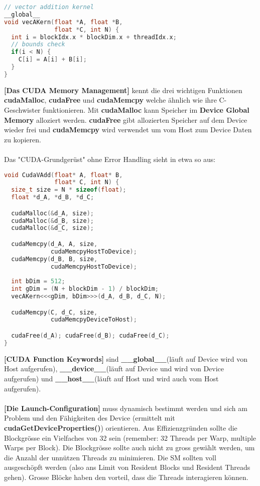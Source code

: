 \documentclass[8pt]{extarticle}
\let\oldtextbf\textbf
\renewcommand{\textbf}{\tiny\oldtextbf}
\begin{document}
\begin{multicols*}{5}
\begin{lstlisting}[language=c]
// vector addition kernel
__global__
void vecAKern(float *A, float *B,
              float *C, int N) {
  int i = blockIdx.x * blockDim.x + threadIdx.x;
  // bounds check
  if(i < N) {
    C[i] = A[i] + B[i];
  }
}
\end{lstlisting}
\textbf{[Das CUDA Memory Management]} kennt die drei wichtigen Funktionen \textbf{cudaMalloc}, \textbf{cudaFree} und \textbf{cudaMemcpy} welche ähnlich wie ihre C-Geschwister funktionieren. Mit \textbf{cudaMalloc} kann Speicher im \textbf{Device Global Memory} alloziert werden. \textbf{cudaFree} gibt allozierten Speicher auf dem Device wieder frei und \textbf{cudaMemcpy} wird verwendet um vom Host zum Device Daten zu kopieren.\\\\
Das "CUDA-Grundgerüst" ohne Error Handling sieht in etwa so aus:
\begin{lstlisting}[language=c]
void CudaVAdd(float* A, float* B,
              float* C, int N) {
  size_t size = N * sizeof(float);
  float *d_A, *d_B, *d_C;

  cudaMalloc(&d_A, size);
  cudaMalloc(&d_B, size);
  cudaMalloc(&d_C, size);

  cudaMemcpy(d_A, A, size,
             cudaMemcpyHostToDevice);
  cudaMemcpy(d_B, B, size,
             cudaMemcpyHostToDevice);
  
  int bDim = 512;
  int gDim = (N + blockDim - 1) / blockDim;
  vecAKern<<<gDim, bDim>>>(d_A, d_B, d_C, N);

  cudaMemcpy(C, d_C, size,
             cudaMemcpyDeviceToHost);

  cudaFree(d_A); cudaFree(d_B); cudaFree(d_C);
}
\end{lstlisting}
\textbf{[CUDA Function Keywords]} sind \textbf{\_\_global\_\_}(läuft auf Device wird von Host aufgerufen), \textbf{\_\_device\_\_}(läuft auf Device und wird von Device aufgerufen) und \textbf{\_\_host\_\_}(läuft auf Host und wird auch vom Host aufgerufen).\\\\
\textbf{[Die Launch-Configuration]} muss dynamisch bestimmt werden und sich am Problem und den Fähigkeiten des Device (ermittelt mit \textbf{cudaGetDeviceProperties()}) orientieren. Aus Effizienzgründen sollte die Blockgrösse ein Vielfaches von 32 sein (remember: 32 Threads per Warp, multiple Warps per Block). Die Blockgrösse sollte auch nicht zu gross gewählt werden, um die Anzahl der unnützen Threads zu minimieren. Die SM sollten voll ausgeschöpft werden (also ans Limit von Resident Blocks und Resident Threads gehen). Grosse Blöcke haben den vorteil, dass die Threads interagieren können.
\end{multicols*}
\end{document}
